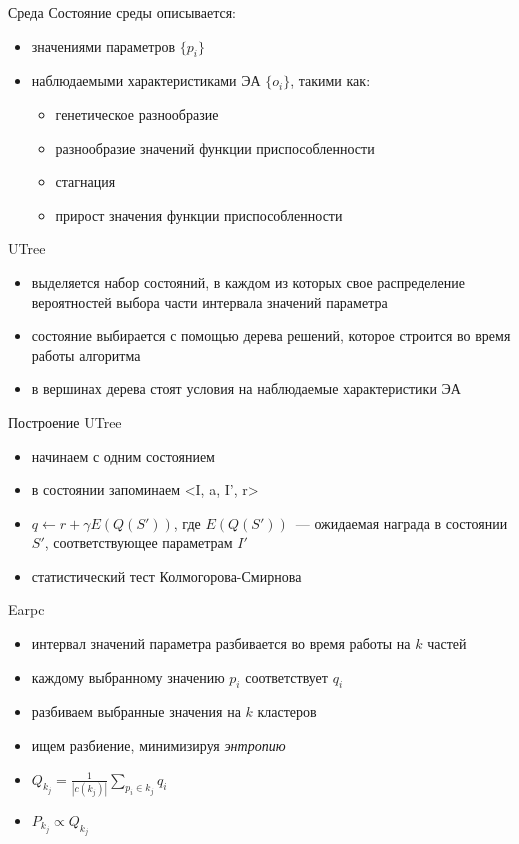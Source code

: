 \documentclass[hyperref=unicode,graphics=pdflatex,13pt]{beamer}
\begin{document}
\begin{frame}{Среда}
 Состояние среды описывается:
 \begin{itemize}
     \item значениями параметров $\{p_i\}$
     \item наблюдаемыми характеристиками ЭА $\{o_i\}$, такими как:
     \begin{itemize}
        \item генетическое разнообразие
        \item разнообразие значений функции приспособленности
        \item стагнация
        \item прирост значения функции приспособленности
     \end{itemize}
 \end{itemize}
\end{frame}

\begin{frame} {UTree}
  \begin{itemize}
    \item выделяется набор состояний, в каждом из которых свое распределение вероятностей выбора части интервала значений параметра
    \item состояние выбирается с помощью дерева решений, которое строится во время работы алгоритма
    \item в вершинах дерева стоят условия на наблюдаемые характеристики ЭА
  \end{itemize}
\end{frame}

\begin{frame}{Построение UTree}
    \begin{itemize}
        \item начинаем с одним состоянием
        \item в состоянии запоминаем <I, a, I', r>
        \item $q \gets r + \gamma E(Q(S'))$, где $E(Q(S'))$~--- ожидаемая награда в состоянии $S'$, соответствующее параметрам $I'$
        \item статистический тест Колмогорова-Смирнова
    \end{itemize}
\end{frame}


\begin{frame}{Earpc}
  \begin{itemize}
    \item интервал значений параметра разбивается во время работы на $k$ частей
    \item каждому выбранному значению $p_i$ соответствует $q_i$
    \item разбиваем выбранные значения на $k$ кластеров
    \item ищем разбиение, минимизируя \textit{энтропию}
    \item $Q_{k_j} = \frac{1}{|c(k_j)|}\sum\limits_{p_i \in k_j}{q_i}$
    \item $P_{k_j} \propto Q_{k_j}$
  \end{itemize}
\end{frame}
\end{document}
